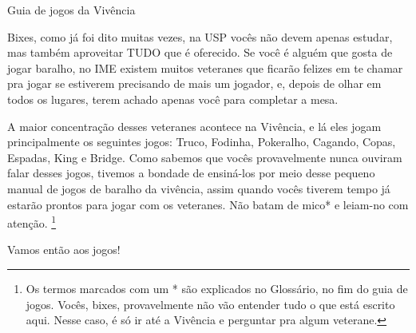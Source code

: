\begin{secao}{Guia de jogos da Vivência }

Bixes, como já foi dito muitas vezes, na USP vocês não devem apenas estudar, mas
também aproveitar TUDO que é oferecido. Se você é alguém que gosta de jogar
baralho, no IME existem muitos veteranes que ficarão felizes em te chamar pra
jogar se estiverem precisando de mais um jogador, e, depois de olhar em todos
os lugares, terem achado apenas você para completar a mesa.

A maior concentração desses veteranes acontece na Vivência, e lá eles jogam
principalmente os seguintes jogos: Truco, Fodinha, Pokeralho, Cagando, Copas, Espadas,
King e Bridge. Como sabemos que vocês provavelmente nunca ouviram falar desses jogos,
tivemos a bondade de ensiná-los por meio desse pequeno manual de jogos de baralho da
vivência, assim quando vocês tiverem tempo já estarão prontos para jogar com os veteranes.
Não batam de mico* e leiam-no com atenção. \footnote{Os termos marcados com um * são explicados
no Glossário, no fim do guia de jogos. Vocês, bixes, provavelmente não vão entender tudo o que
está escrito aqui. Nesse caso, é só ir até a Vivência e perguntar pra algum veterane.}

Vamos então aos jogos!







\pagebreak




\end{secao}
